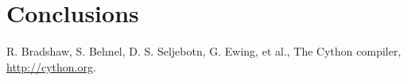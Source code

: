 \documentclass[12pt]{article}
\theoremstyle{definition}
\begin{document}
\section{Conclusions}



\begin{thebibliography}{9}

R. Bradshaw, S. Behnel, D. S. Seljebotn, G. Ewing, et al.,
The Cython compiler, \url{http://cython.org}.

\end{thebibliography}
\end{document}
